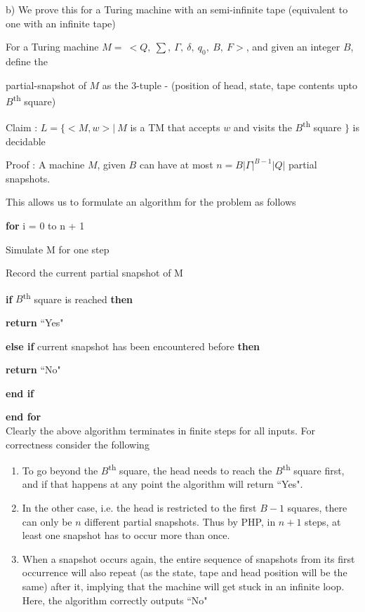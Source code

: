 \documentclass{article}
\begin{document}
    b) We prove this for a Turing machine with an semi-infinite tape (equivalent to one with an infinite tape)
    
    \quad For a Turing machine $M = ~<Q,~\sum,~\Gamma,~\delta,~q_0,~B,~F>$, and given an integer $B$, define the 
    
    \quad partial-snapshot of $M$ as the 3-tuple - (position of head, state, tape contents upto $B$\textsuperscript{th} square)
    
    \quad Claim : $L = \{<M, w> |~ M$ is a TM that accepts $w$ and visits the $B$\textsuperscript{th} square $\}$ is decidable
    
    \quad Proof : A machine $M$, given $B$ can have at most $n = B|\Gamma|^{B - 1}|Q|$ partial snapshots. 
    
    \quad This allows us to formulate an algorithm for the problem as follows
    
    \qquad \textbf{for} i = 0 to n + 1
    
    \qquad \quad Simulate M for one step
    
    \qquad \quad Record the current partial snapshot of M
    
    \qquad \quad \textbf{if} $B$\textsuperscript{th} square is reached \textbf{then}
    
    \qquad \qquad \textbf{return} ``Yes"
    
    \qquad \quad \textbf{else if} current snapshot has been encountered before \textbf{then}
    
    \qquad \qquad \textbf{return} ``No"
    
    \qquad \quad \textbf{end if}
    
    \qquad \textbf{end for}\\
    
    \quad Clearly the above algorithm terminates in finite steps for all inputs. For correctness consider the following
    \begin{enumerate}
        \item To go beyond the $B$\textsuperscript{th} square, the head needs to reach the $B$\textsuperscript{th} square first, and if that happens at any point the algorithm will return ``Yes".
        \item In the other case, i.e. the head is restricted to the first $B - 1$ squares, there can only be $n$ different partial snapshots. Thus by PHP, in $n + 1$ steps, at least one snapshot has to occur more than once.
        \item When a snapshot occurs again, the entire sequence of snapshots from its first occurrence will also repeat (as the state, tape and head position will be the same) after it, implying that the machine will get stuck in an infinite loop. Here, the algorithm correctly outputs ``No"
    \end{enumerate}
\end{document}

